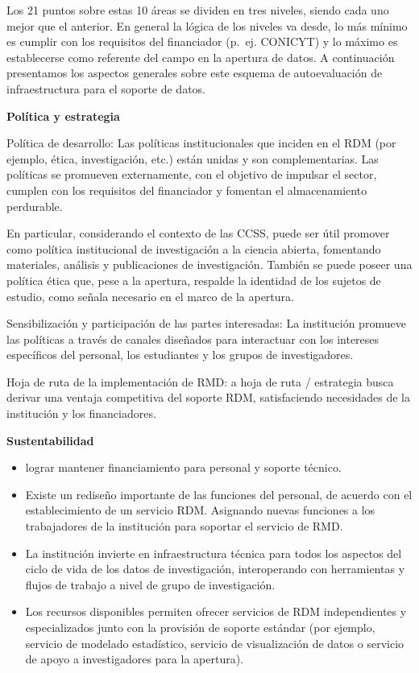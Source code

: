 \documentclass[
  14pt,
]{book}
\begin{document}
Los 21 puntos sobre estas 10 áreas se dividen en tres niveles, siendo cada uno mejor que el anterior. En general la lógica de los niveles va desde, lo más mínimo es cumplir con los requisitos del financiador (p.~ej. CONICYT) y lo máximo es establecerse como referente del campo en la apertura de datos. A continuación presentamos los aspectos generales sobre este esquema de autoevaluación de infraestructura para el soporte de datos.

\textbf{Política y estrategia}

Política de desarrollo: Las políticas institucionales que inciden en el RDM (por ejemplo, ética, investigación, etc.) están unidas y son complementarias. Las políticas se promueven externamente, con el objetivo de impulsar el sector, cumplen con los requisitos del financiador y fomentan el almacenamiento perdurable.

En particular, considerando el contexto de las CCSS, puede ser útil promover como política institucional de investigación a la ciencia abierta, fomentando materiales, análisis y publicaciones de investigación. También se puede poseer una política ética que, pese a la apertura, respalde la identidad de los sujetos de estudio, como \citet{dennis_Privacy_2019} señala necesario en el marco de la apertura.

Sensibilización y participación de las partes interesadas: La institución promueve las políticas a través de canales diseñados para interactuar con los intereses específicos del personal, los estudiantes y los grupos de investigadores.

Hoja de ruta de la implementación de RMD: a hoja de ruta / estrategia busca derivar una ventaja competitiva del soporte RDM, satisfaciendo necesidades de la institución y los financiadores.

\textbf{Sustentabilidad}

\begin{itemize}
\item
  lograr mantener financiamiento para personal y soporte técnico.
\item
  Existe un rediseño importante de las funciones del personal, de acuerdo con el establecimiento de un servicio RDM. Asignando nuevas funciones a los trabajadores de la institución para soportar el servicio de RMD.
\item
  La institución invierte en infraestructura técnica para todos los aspectos del ciclo de vida de los datos de investigación, interoperando con herramientas y flujos de trabajo a nivel de grupo de investigación.
\item
  Los recursos disponibles permiten ofrecer servicios de RDM independientes y especializados junto con la provisión de soporte estándar (por ejemplo, servicio de modelado estadístico, servicio de visualización de datos o servicio de apoyo a investigadores para la apertura).
\end{itemize}
\end{document}
